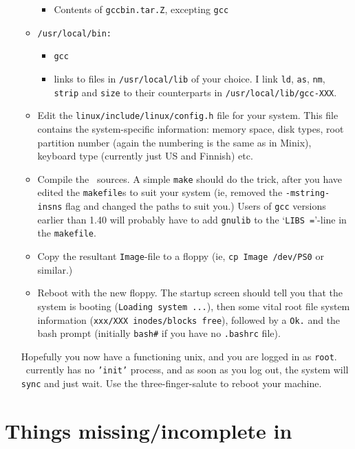 \begin{enumerate}
\begin{itemize}
\begin{itemize}
\item Contents of {\tt gccbin.tar.Z}, excepting {\tt gcc}
\end{itemize}
\item{\tt/usr/local/bin:}
\begin{itemize}
\item{\tt gcc}
\item links to files in {\tt/usr/local/lib} of your choice. I link
{\tt ld}, {\tt as}, {\tt nm}, {\tt strip} and {\tt size} to their
counterparts in {\tt/usr/local/lib/gcc-XXX}.
\end{itemize}
%
\item Edit the {\tt linux/include/linux/config.h} file for your system. 
This file contains the system-specific information: memory space, disk
types, root partition number (again the numbering is the same as in
Minix), keyboard type (currently just US and Finnish) etc. 
%
\item Compile the \Linux\ sources.  A simple {\tt make} should do the
trick, after you have edited the {\tt makefile}s to suit your system
(ie, removed the {\tt-mstring-insns} flag and changed the paths to suit
you.) Users of {\tt gcc} versions earlier than 1.40 will probably have
to add {\tt gnulib} to the `{\tt LIBS =}'-line in the {\tt makefile}. 
%
\item Copy the resultant {\tt Image}-file to a floppy (ie, {\tt cp Image
/dev/PS0} or similar.)
%
\item Reboot with the new floppy. The startup screen should tell you
that the system is booting ({\tt Loading system ...}), then some vital
root file system information ({\tt xxx/XXX inodes/blocks free}),
followed by a {\tt Ok.} and the bash prompt (initially {\tt bash\#} if
you have no {\tt.bashrc} file).
\end{itemize}

Hopefully you now have a functioning unix, and you are logged in as
{\tt root}. \Linux\ currently has no {\tt'init'} process, and as soon
as you log out, the system will {\tt sync} and just wait. Use the
three-finger-salute to reboot your machine.

\end{enumerate}

\section{Things missing/incomplete in \Linux}

